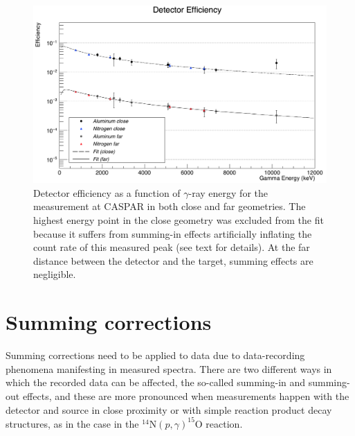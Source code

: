 \begin{figure}
\centering
\includegraphics[width=\linewidth]{figures/efficiencyComplete.png}
\caption{Detector efficiency as a function of $\gamma$-ray energy for the measurement at CASPAR in both close and far geometries. The highest energy point in the close geometry was excluded from the fit because it suffers from summing-in effects artificially inflating the count rate of this measured peak (see text for details). At the far distance between the detector and the target, summing effects are negligible.   }
\label{fig: efficiency}
\end{figure}



\section{Summing corrections}
\label{sec: summing}

Summing corrections need to be applied to data due to data-recording phenomena manifesting in measured spectra. There are two different ways in which the recorded data can be affected, the so-called summing-in and summing-out effects, and these are more pronounced when measurements happen with the detector and source in close proximity or with simple reaction product decay structures, as in the case in the $^{14}$N$\left( p,\gamma \right) ^{15}$O reaction.


